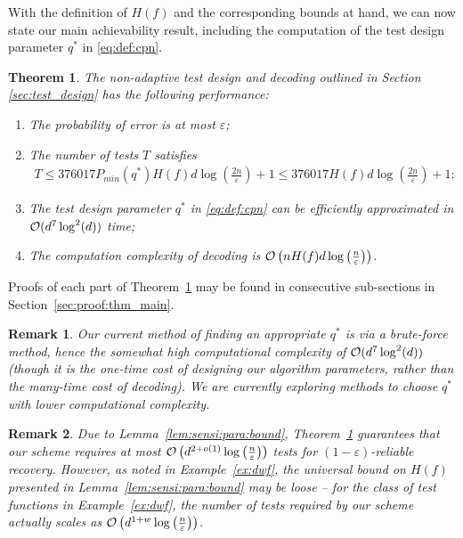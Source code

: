\documentclass[onecolumn,letterpaper]{IEEEtran}
\newtheorem{theorem}{Theorem}
\newtheorem{remark}{Remark}
\newcommand{\cD}{{\cal D}}
\newcommand{\cO}{{\cal O}}
\newcommand{\cp}{{q}}
\newcommand{\cpn}{{\cp^*}}
\newcommand{\pminn}{{P_{min}(\cpn)}}
\newcommand{\fH}{{H(f)}}
\begin{document}
With the definition of $\fH$ and the corresponding bounds at hand, we can now state our main achievability result, including the computation of the test design parameter $\cpn$ in \eqref{eq:def:cpn}.
\begin{theorem} 
\label{thm:main}
The non-adaptive test design and decoding outlined in Section \ref{sec:test_design} has the following performance:
\begin{enumerate}[label=\alph*)]
  \item  
  The probability of error is at most $\varepsilon$; %
  \label{thm1:item1}
  \item  \label{thm1:item3}
  The number of tests $T$ satisfies
  \begin{align}
  \label{eq:thm:T:ub}
    T \leq 376017  \pminn  \fH d\log \left( \frac{2n}{\varepsilon } \right)+1 \leq 376017 \fH d\log\left( \frac{2n}{\varepsilon} \right)+1;
  \end{align}
  \item 
  The test design parameter $\cpn$ in \eqref{eq:def:cpn} can be efficiently approximated in $\cO(d^7 \log^2(d))$ time; \label{thm1:item4}
  \item  
  The computation complexity of decoding is $\cO \left( n\fH d  \log \left( \frac{n}{\varepsilon} \right) \right)$. \label{thm1:item2}
\end{enumerate}
\end{theorem}

Proofs of each part of Theorem~\ref{thm:main} may be found in consecutive sub-sections in Section~\ref{sec:proof:thm_main}. 

\begin{remark}
Our current method of finding an appropriate $\cpn$ is via a brute-force method, hence the somewhat high computational complexity of $\cO(d^7 \log^2(d))$ (though it is the one-time cost of {\it designing} our algorithm parameters, rather than the many-time cost of {\it decoding}). We are currently exploring methods to choose $\cpn$ with lower computational complexity.
\end{remark}

\begin{remark}
\label{remark:ub}
Due to Lemma~\ref{lem:sensi:para:bound}, Theorem~\ref{thm:main} guarantees that our scheme requires at most ${\cal O}\left(d^{2+o(1)}\log \left(\frac n \varepsilon\right) \right)$ tests for $(1-\varepsilon)$-reliable recovery. However, as noted in Example~\ref{ex:dwf}, the universal bound on $\fH$ presented in Lemma~\ref{lem:sensi:para:bound} may be loose -- for the class of test functions in Example~\ref{ex:dwf}, the number of tests required by our scheme actually scales as ${\cal O}\left(d^{1+w}\log \left(\frac {n}{\varepsilon}\right) \right)$.
\end{remark}
\end{document}

